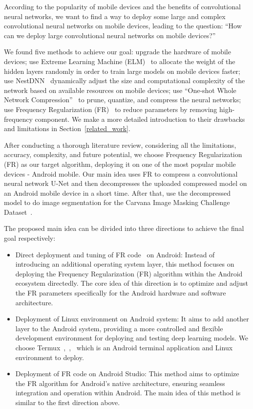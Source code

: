 \documentclass[conference]{IEEEtran}
\begin{document}
According to the popularity of mobile devices and the benefits of convolutional neural networks, we want to find a way to deploy some large and complex convolutional neural networks on mobile devices, leading to the question: “How can we deploy large convolutional neural networks on mobile devices?”

We found five methods to achieve our goal: upgrade the hardware of mobile devices; use Extreme Learning Machine (ELM)~\cite{anton2021elm} to allocate the weight of the hidden layers randomly in order to train large models on mobile devices faster; use NestDNN~\cite{fang2018nestdnn} dynamically adjust the size and computational complexity of the network based on available resources on mobile devices; use “One-shot Whole Network Compression”~\cite{kim2016oneshot} to prune, quantize, and compress the neural networks; use Frequency Regularization (FR)~\cite{zhao2023fr} to reduce parameters by removing high-frequency component. We make a more detailed introduction to their drawbacks and limitations in Section~\ref{related_work}.

After conducting a thorough literature review, considering all the limitations, accuracy, complexity, and future potential, we choose Frequency Regularization (FR) as our target algorithm, deploying it on one of the most popular mobile devices - Android mobile. Our main idea uses FR to compress a convolutional neural network U-Net and then decompresses the uploaded compressed model on an Android mobile device in a short time. After that, use the decompressed model to do image segmentation for the Carvana Image Masking Challenge Dataset~\cite{brian2017carvanadataset}. 

The proposed main idea can be divided into three directions to achieve the final goal respectively:
\begin{itemize}
	\item Direct deployment and tuning of FR code~\cite{fr_repo} on Android: Instead of introducing an additional operating system layer, this method focuses on deploying the Frequency Regularization (FR) algorithm within the Android ecosystem directedly. The core idea of this direction is to optimize and adjust the FR parameters specifically for the Android hardware and software architecture. 
	\item Deployment of Linux environment on Android system: It aims to add another layer to the Android system, providing a more controlled and flexible development environment for deploying and testing deep learning models. We choose Termux~\cite{termux_repo},~\cite{termux_overview},~\cite{termux_wiki} which is an Android terminal application and Linux environment to deploy. 
	\item Deployment of FR code on Android Studio: This method aims to optimize the FR algorithm for Android's native architecture, ensuring seamless integration and operation within Android. The main idea of this method is similar to the first direction above.
\end{itemize}	 		
\end{document}
